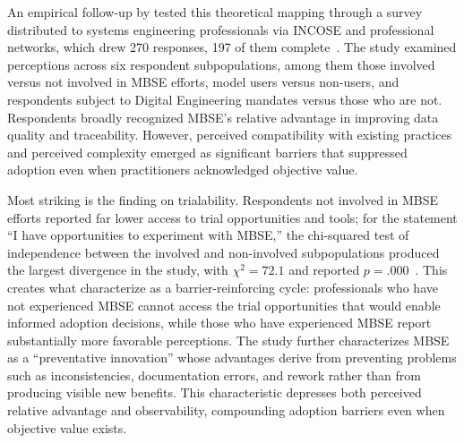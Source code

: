 An empirical follow-up by \citeauthor{Call_2024} tested this theoretical mapping through a survey distributed to systems engineering professionals via INCOSE and professional networks, which drew 270 responses, 197 of them complete~\parencite{Call_2024}. The study examined perceptions across six respondent subpopulations, among them those involved versus not involved in MBSE efforts, model users versus non-users, and respondents subject to Digital Engineering mandates versus those who are not. Respondents broadly recognized MBSE's relative advantage in improving data quality and traceability. However, perceived compatibility with existing practices and perceived complexity emerged as significant barriers that suppressed adoption even when practitioners acknowledged objective value.

Most striking is the finding on trialability. Respondents not involved in MBSE efforts reported far lower access to trial opportunities and tools; for the statement ``I have opportunities to experiment with MBSE,'' the chi-squared test of independence between the involved and non-involved subpopulations produced the largest divergence in the study, with \(\chi^2 = 72.1\) and reported \(p = .000\)~\parencite{Call_2024, Call_2024_Dissertation}.
This creates what \citeauthor{Call_2024} characterize as a barrier-reinforcing cycle: professionals who have not experienced MBSE cannot access the trial opportunities that would enable informed adoption decisions, while those who have experienced MBSE report substantially more favorable perceptions. The study further characterizes MBSE as a ``preventative innovation'' whose advantages derive from preventing problems such as inconsistencies, documentation errors, and rework rather than from producing visible new benefits. This characteristic depresses both perceived relative advantage and observability, compounding adoption barriers even when objective value exists.

